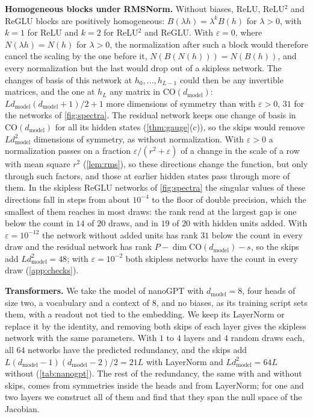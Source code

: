 \documentclass[10pt]{article}
\theoremstyle{definition}
\theoremstyle{remark}
\newcommand{\dm}{d_{\mathrm{model}}}
\newcommand{\CO}{\mathrm{CO}}
\newcommand{\para}[1]{\smallskip\noindent\textbf{#1}\hspace{0.5em}}
\begin{document}
\para{Homogeneous blocks under RMSNorm.} Without biases, ReLU, ReLU$^2$ and ReGLU blocks are positively homogeneous: $B(\lambda h) = \lambda^k B(h)$ for $\lambda > 0$, with $k = 1$ for ReLU and $k = 2$ for ReLU$^2$ and ReGLU. With $\varepsilon = 0$, where $N(\lambda h) = N(h)$ for $\lambda > 0$, the normalization after such a block would therefore cancel the scaling by the one before it, $N(B(N(h))) = N(B(h))$, and every normalization but the last would drop out of a skipless network. The changes of basis of this network at $h_0, \dots, h_{L-1}$ could then be any invertible matrices, and the one at $h_L$ any matrix in $\CO(\dm)$: $L\dm(\dm+1)/2 + 1$ more dimensions of symmetry than with $\varepsilon > 0$, $31$ for the networks of \cref{fig:spectra}. The residual network keeps one change of basis in $\CO(\dm)$ for all its hidden states (\cref{thm:gauge}(c)), so the skips would remove $L\dm^2$ dimensions of symmetry, as without normalization. With $\varepsilon > 0$ a normalization passes on a fraction $\varepsilon/(r^2 + \varepsilon)$ of a change in the scale of a row with mean square $r^2$ (\cref{lem:rms}), so these directions change the function, but only through such factors, and those at earlier hidden states pass through more of them. In the skipless ReGLU networks of \cref{fig:spectra} the singular values of these directions fall in steps from about $10^{-4}$ to the floor of double precision, which the smallest of them reaches in most draws: the rank read at the largest gap is one below the count in $14$ of $20$ draws, and in $19$ of $20$ with hidden units added. With $\varepsilon = 10^{-12}$ the network without added units has rank $31$ below the count in every draw and the residual network has rank $P - \dim\CO(\dm) - s$, so the skips add $L\dm^2 = 48$; with $\varepsilon = 10^{-2}$ both skipless networks have the count in every draw (\cref{app:checks}).

\para{Transformers.} We take the model of nanoGPT \citep{karpathy2023nanogpt} with $\dm = 8$, four heads of size two, a vocabulary and a context of $8$, and no biases, as its training script sets them, with a readout not tied to the embedding. We keep its LayerNorm or replace it by the identity, and removing both skips of each layer gives the skipless network with the same parameters. With $1$ to $4$ layers and $4$ random draws each, all $64$ networks have the predicted redundancy, and the skips add $L(\dm-1)(\dm-2)/2 = 21L$ with LayerNorm and $L\dm^2 = 64L$ without (\cref{tab:nanogpt}). The rest of the redundancy, the same with and without skips, comes from symmetries inside the heads and from LayerNorm; for one and two layers we construct all of them and find that they span the null space of the Jacobian.
\end{document}
